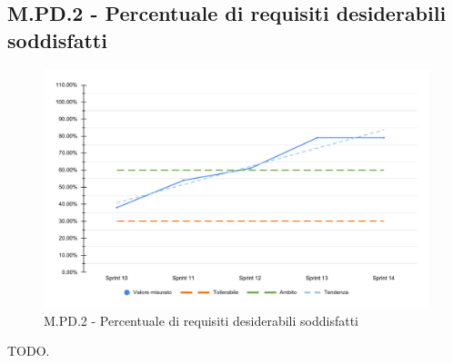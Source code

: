 \subsection{M.PD.2 - Percentuale di requisiti desiderabili soddisfatti}

\begin{figure}[H]
    \centering
    \includegraphics[width=\textwidth]{assets/requisiti_desiderabili_soddisfatti.pdf}
    \caption{M.PD.2 - Percentuale di requisiti desiderabili soddisfatti}
\end{figure}

\par TODO.